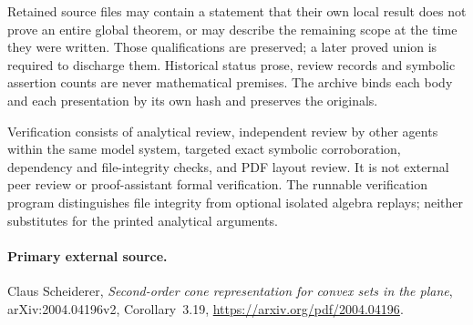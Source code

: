 Retained source files may contain a statement that their own local
result does not prove an entire global theorem, or may describe the
remaining scope at the time they were written.  Those qualifications
are preserved; a later proved union is required to discharge them.
Historical status prose, review records and symbolic assertion counts
are never mathematical premises.  The archive binds each body and
each presentation by its own hash and preserves the originals.

Verification consists of analytical review, independent review by
other agents within the same model system, targeted exact symbolic
corroboration, dependency and file-integrity checks, and PDF layout
review.  It is not external peer review or proof-assistant formal
verification.  The runnable verification program distinguishes file
integrity from optional isolated algebra replays; neither substitutes
for the printed analytical arguments.

\paragraph{Primary external source.}
Claus Scheiderer, \emph{Second-order cone representation for convex sets
in the plane}, arXiv:2004.04196v2, Corollary~3.19,
\url{https://arxiv.org/pdf/2004.04196}.
